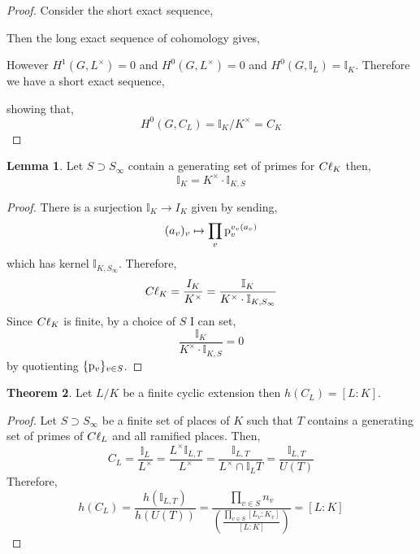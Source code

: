 \documentclass[12pt]{extarticle}
\newcommand{\idele}[1]{\mathbb{I}_{#1}}
\newcommand{\sidele}[2]{\mathbb{I}_{#1, #2}}
\theoremstyle{definition}
\newtheorem{theorem}{Theorem}[section]
\newtheorem{lemma}[theorem]{Lemma}
\begin{document}
\begin{proof}
Consider the short exact sequence,
\begin{center}
\end{center}
Then the long exact sequence of cohomology gives,
\begin{center}
\end{center}
However $H^1(G, L^\times) = 0$ and $H^0(G, L^\times) = 0$ and $H^0(G, \idele{L}) = \idele{K}$. Therefore we have a short exact sequence,
\begin{center}
\end{center}
showing that,
\[ H^0(G, C_L) = \idele{K}/K^\times = C_K \]
\end{proof}

\begin{lemma}
Let $S \supset S_\infty$ contain a generating set of primes for $C\ell_K$ then,
\[ \idele{K} = K^\times \cdot \sidele{K}{S} \]
\end{lemma}

\begin{proof}
There is a surjection $\idele{K} \to I_K$ given by sending,
\[ (a_v)_v \mapsto \prod_v \mathrm{p}_v^{v_v(a_v)} \]
which has kernel $\sidele{K}{S_\infty}$. 
Therefore,
\[ \Cl_K = \frac{I_K}{K^\times} = \frac{\idele{K}}{K^\times \cdot \sidele{K}{S_\infty}} \]
Since $C\ell_K$ is finite, by a choice of $S$ I can set,
\[ \frac{\idele{K}}{K^\times \cdot \sidele{K}{S}} = 0 \]
by quotienting $\{ \mathrm{p}_v \}_{v \in S}$. 
\end{proof}

\begin{theorem}
Let $L / K$ be a finite cyclic extension then $h(C_L) = [L : K]$. 
\end{theorem}

\begin{proof}
Let $S \supset S_\infty$ be a finite set of places of $K$ such that $T$ contains a generating set of primes of $C\ell_L$ and all ramified places. Then,
\[ C_L = \frac{\idele{L}}{L^\times} = \frac{L^\times \sidele{L}{T}}{L^\times} = \frac{\sidele{L}{T}}{L^\times \cap \idele{L}{T}} = \frac{\sidele{L}{T}}{U(T)} \]
Therefore,
\[ h(C_L) = \frac{h(\sidele{L}{T})}{h(U(T))} = \frac{\prod\limits_{v \in S} n_v}{\left( \frac{\prod\limits_{v \in S} [L_v : K_v]}{[L : K]} \right)} = [L : K] \]
\end{proof}
\end{document}
